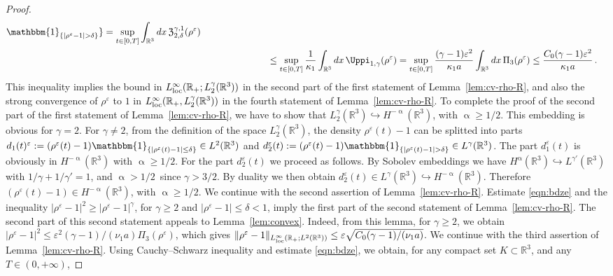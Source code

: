 \documentclass[11pt,reqno]{amsart}
\def \R{{\mathbb{R}}}
\begin{document}
\begin{proof}
\begin{align}
\mathbbm{1}_{\{|\rho^\varepsilon-1|>\delta\}} \} 
= \sup_{t \in [0,T]}\int_{\R^3} dx\, \mathfrak Z_{2,\delta}^{\gamma,1}(\rho^\varepsilon) \nonumber \\
& \hspace{2.5cm} \leq \sup_{t \in [0,T]} \frac{1}{\kappa_1}\int_{\R^3} dx\, \Uppi_{1,\gamma}(\rho^\varepsilon)
= \sup_{t \in [0,T]} \frac{(\gamma-1)\varepsilon^2}{\kappa_1  a} \int_{\R^3} dx\, \Pi_3(\rho^\varepsilon)
\leq\frac{ C_0(\gamma-1)\varepsilon^2}{\kappa_1  a}\,.
\end{align}
This inequality implies the bound in $L_{\rm loc}^\infty(\R_+; L_2^\gamma(\R^3))$ in the second part of the first  statement of Lemma~\ref{lem:cv-rho-R}, and also the strong convergence of $\rho^\varepsilon$ to $1$ in $L_{\rm loc}^\infty(\R_+, L_2^\gamma(\R^3))$ in the fourth statement of Lemma~\ref{lem:cv-rho-R}. To complete the proof of the second part of the first  statement of Lemma~\ref{lem:cv-rho-R}, we have to show that $L_2^\gamma(\R^3) \hookrightarrow H^{-\upalpha}(\R^3)$, with $\upalpha \geq 1/2$. This embedding is obvious for $\gamma=2$. For $\gamma \neq 2$, from the definition of the space  $L_2^\gamma(\R^3)$, the density $\rho^\varepsilon(t)-1$ can be splitted into parts $d_1(t)^\varepsilon:=(\rho^\varepsilon(t) -1) \mathbbm{1}_{\{|{\rho^\varepsilon(t)-1}|\leq \delta\}} \in L^2(\R^3)$  and $d_2^\varepsilon(t):=(\rho^\varepsilon(t) -1) \mathbbm{1}_{\{|{\rho^\varepsilon(t)-1}|> \delta\}} \in L^\gamma(\R^3)$. The part $d_1^\varepsilon(t)$ is obviously in $H^{-\upalpha}(\R^3)$ with $\upalpha \geq 1/2$.  For the part $d_2^\varepsilon(t)$ we proceed as follows. By Sobolev embeddings we have $H^\upalpha(\R^3)  \hookrightarrow L^{\gamma'}(\R^3)$ with $1/\gamma +1/\gamma'=1$, and $\upalpha>1/2\, $ since $\gamma>3/2$. By duality we then obtain $d_2^\varepsilon(t) \in L^\gamma(\R^3)  \hookrightarrow H^{-\upalpha}(\R^3)$. Therefore $(\rho^\varepsilon(t) -1) \in  H^{-\upalpha}(\R^3)$, with $\upalpha \geq 1/2$. We continue with the second assertion of  Lemma~\ref{lem:cv-rho-R}. Estimate \eqref{eqn:bdze} and the inequality $|\rho^\varepsilon -1|^2 \geq |\rho^\varepsilon-1|^\gamma$, for $\gamma\geq 2$ and $|\rho^\varepsilon-1| \leq \delta <1$, imply the first part of the second statement of Lemma~\ref{lem:cv-rho-R}. The second part of this second statement appeals to Lemma~\ref{lem:convex}. Indeed, from this lemma, for $\gamma \geq 2$, we obtain $|\rho^\varepsilon -1|^2 \leq \varepsilon^2(\gamma-1)/(\nu_1  a)\Pi_3(\rho^\varepsilon)$, which gives $\| \rho^\varepsilon -1\|_{ L_{\rm loc}^\infty(\R_+; L^2(\R^3))} \leq  \varepsilon \sqrt{C_0 (\gamma-1)/(\nu_1  a)}$. We continue with the third assertion of Lemma~\ref{lem:cv-rho-R}. Using Cauchy--Schwarz inequality and estimate \eqref{eqn:bdze}, we obtain, for any compact set $K\subset \R^3$, and any $T\in (0,+\infty)$,

\end{proof}
\end{document}
